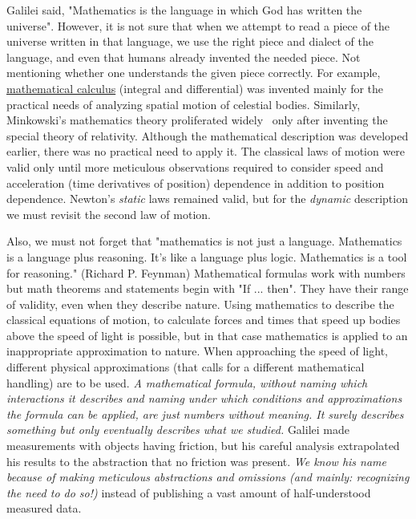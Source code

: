 {

Galilei said, "Mathematics is the language in which God has written
the universe". However, it is not sure that when we attempt to read
a piece of the universe written in that language, we use the right
piece and dialect of the language, and even that humans already invented the
needed piece. Not mentioning whether one understands the
given piece correctly.  
For example,  \href{https://en.wikipedia.org/wiki/Calculus} {mathematical calculus}
(integral and differential) was invented mainly for the practical needs of analyzing spatial motion of celestial bodies.
Similarly, Minkowski's mathematics theory proliferated widely~ \cite{EinsteinMinkowskiRelativity:1977}
only after inventing the special theory of relativity.
Although the mathematical description was developed earlier, there was no practical
need to apply it.
The classical laws of motion were valid only until more meticulous observations required
to consider speed and acceleration (time derivatives of position) dependence in addition to position dependence.
Newton's \textit{static} laws remained valid, but for the \textit{dynamic} description we must revisit the second law of motion. 

Also, we must not forget that "mathematics is not just a language. Mathematics is a language plus reasoning. It's like a language plus logic. Mathematics is a tool for reasoning." (Richard P. Feynman)
Mathematical formulas work with numbers but math theorems and statements begin with "If ... then".
They have their range of validity, even when they describe nature.
Using mathematics to describe the classical equations of motion,
to calculate forces and times that speed up bodies
above the speed of light is possible, but in that case mathematics is applied to
an inappropriate approximation to nature. When approaching the speed of light,
different physical approximations (that calls for a different mathematical handling) are to be used.
\textit{A mathematical formula, without naming which interactions it describes
 and naming
under which conditions and approximations the formula can be applied, are just numbers without meaning.
It surely describes something but only eventually describes what we studied.}
Galilei made measurements with objects having friction, but his careful analysis
extrapolated his results to the abstraction that no friction was present.
\textit{We know his name because of making meticulous abstractions and omissions (and mainly:
recognizing the need to do so!)} instead of publishing a vast amount of
half-understood measured data.
}

